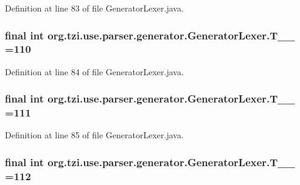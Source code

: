 Definition at line 83 of file Generator\-Lexer.\-java.

\hypertarget{classorg_1_1tzi_1_1use_1_1parser_1_1generator_1_1_generator_lexer_a4a379a1c2f1e07f4cb0c1bcaad9df5b3}{
\subsubsection[{T\-\_\-\-\_\-110}]{\setlength{\rightskip}{0pt plus 5cm}final int org.\-tzi.\-use.\-parser.\-generator.\-Generator\-Lexer.\-T\-\_\-\-\_ =110\hspace{0.3cm}{\ttfamily [static]}}}\label{classorg_1_1tzi_1_1use_1_1parser_1_1generator_1_1_generator_lexer_a4a379a1c2f1e07f4cb0c1bcaad9df5b3}


Definition at line 84 of file Generator\-Lexer.\-java.

\hypertarget{classorg_1_1tzi_1_1use_1_1parser_1_1generator_1_1_generator_lexer_a08f4042970f0564eaafb70bd0c16aa58}{
\subsubsection[{T\-\_\-\-\_\-111}]{\setlength{\rightskip}{0pt plus 5cm}final int org.\-tzi.\-use.\-parser.\-generator.\-Generator\-Lexer.\-T\-\_\-\-\_ =111\hspace{0.3cm}{\ttfamily [static]}}}\label{classorg_1_1tzi_1_1use_1_1parser_1_1generator_1_1_generator_lexer_a08f4042970f0564eaafb70bd0c16aa58}


Definition at line 85 of file Generator\-Lexer.\-java.

\hypertarget{classorg_1_1tzi_1_1use_1_1parser_1_1generator_1_1_generator_lexer_a9ce9b224879520851d9d8db2e8ee10df}{
\subsubsection[{T\-\_\-\-\_\-112}]{\setlength{\rightskip}{0pt plus 5cm}final int org.\-tzi.\-use.\-parser.\-generator.\-Generator\-Lexer.\-T\-\_\-\-\_ =112\hspace{0.3cm}{\ttfamily [static]}}}\label{classorg_1_1tzi_1_1use_1_1parser_1_1generator_1_1_generator_lexer_a9ce9b224879520851d9d8db2e8ee10df}


